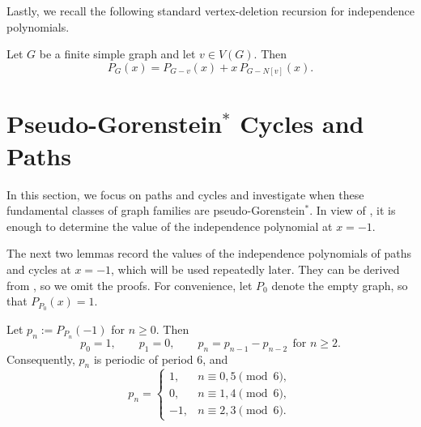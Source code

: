 \documentclass[12pt]{amsart}
\theoremstyle{plain}
\theoremstyle{definition}
\begin{document}

Lastly, we recall the following standard vertex-deletion recursion for independence polynomials.

\begin{lem}\label{lem:delete_contract}
Let \(G\) be a finite simple graph and let \(v\in V(G)\). Then
\[
P_G(x)=P_{G-v}(x)+x\,P_{G-N[v]}(x).
\]
\end{lem}



\section{Pseudo-Gorenstein$^{*}$ Cycles and Paths}\label{sec:cycles_paths}

In this section, we focus on paths and cycles and investigate when these fundamental classes of graph families are pseudo-Gorenstein$^{*}$. In view of , it is enough to
determine the value of the independence polynomial at \(x=-1\).


The next two lemmas record the values of the independence polynomials of paths
and cycles at \(x=-1\), which will be used repeatedly later. They can be derived
from \cite[Corollaries 4.8 and 5.6]{Kara_Vien_2026}, so we omit the proofs.
 For convenience, let \(P_0\) denote the empty graph, so that  \(P_{P_0}(x)=1\). 



\begin{lem}\label{lem:path-minus-one}
Let \(p_n:=P_{P_n}(-1)\) for \(n\ge 0\). Then
\[
p_0=1,\qquad p_1=0,\qquad p_n=p_{n-1}-p_{n-2}\ \ \text{for } n\ge 2.
\]
Consequently, \(p_n\) is periodic of period \(6\), and
\[
p_n=
\begin{cases}
1,& n\equiv 0,5 \pmod 6,\\[4pt]
0,& n\equiv 1,4 \pmod 6,\\[4pt]
-1,& n\equiv 2,3 \pmod 6.
\end{cases}
\]
\end{lem}
\end{document}

